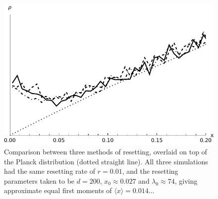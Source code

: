\documentclass[a4paper,12pt,reqno,superscriptaddress,nofootinbib]{revtex4}
\theoremstyle{plain}
\theoremstyle{definition}
\theoremstyle{remark}
\newcommand{\0}{^{(0)}}
\newcommand{\1}{^{(1)}}
\newcommand{\2}{^{(2)}}
\begin{document}
\begin{figure}
	\includegraphics[width=\textwidth]{spd_compare.pdf}
	\caption{Comparison between three methods of resetting, overlaid on top of the Planck distribution (dotted straight line). All three simulations had the same resetting rate of $r=0.01$, and the resetting parameters taken to be $d=200$, $x_0\approx0.027$ and $\lambda_0\approx74$, giving approximate equal first moments of $\langle x \rangle = 0.014...$}\label{fig:compare}
\end{figure}
\end{document}
